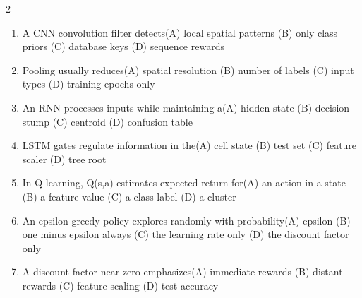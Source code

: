 \documentclass[a4paper]{article}
\begin{document}
\begin{multicols*}{2}
\begin{enumerate}[resume]
\item A CNN convolution filter detects\newline\hspace*{0.6em}(A) local spatial patterns \quad (B) only class priors \newline\hspace*{0.6em}(C) database keys \quad (D) sequence rewards
\item Pooling usually reduces\newline\hspace*{0.6em}(A) spatial resolution \quad (B) number of labels \newline\hspace*{0.6em}(C) input types \quad (D) training epochs only
\item An RNN processes inputs while maintaining a\newline\hspace*{0.6em}(A) hidden state \quad (B) decision stump \newline\hspace*{0.6em}(C) centroid \quad (D) confusion table
\item LSTM gates regulate information in the\newline\hspace*{0.6em}(A) cell state \quad (B) test set \newline\hspace*{0.6em}(C) feature scaler \quad (D) tree root
\item In Q-learning, Q(s,a) estimates expected return for\newline\hspace*{0.6em}(A) an action in a state \quad (B) a feature value \newline\hspace*{0.6em}(C) a class label \quad (D) a cluster
\item An epsilon-greedy policy explores randomly with probability\newline\hspace*{0.6em}(A) epsilon \quad (B) one minus epsilon always \newline\hspace*{0.6em}(C) the learning rate only \quad (D) the discount factor only
\item A discount factor near zero emphasizes\newline\hspace*{0.6em}(A) immediate rewards \quad (B) distant rewards \newline\hspace*{0.6em}(C) feature scaling \quad (D) test accuracy

\end{enumerate}
\end{multicols*}
\end{document}
